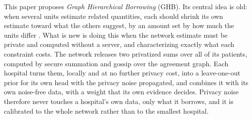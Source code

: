 \documentclass[acmsmall,screen,review]{acmart}
\theoremstyle{acmdefinition}
\begin{document}
This paper proposes \emph{Graph Hierarchical Borrowing} (GHB). Its central idea is old: when several units estimate related quantities, each should shrink its own estimate toward what the others suggest, by an amount set by how much the units differ \cite{efron1973steins,stein1956inadmissibility}. What is new is doing this when the network estimate must be private and computed without a server, and characterizing exactly what each constraint costs. The network releases two privatized sums over all of its patients, computed by secure summation and gossip over the agreement graph. Each hospital turns them, locally and at no further privacy cost, into a leave-one-out prior for its own head with the privacy noise propagated, and combines it with its own noise-free data, with a weight that its own evidence decides. Privacy noise therefore never touches a hospital's own data, only what it borrows, and it is calibrated to the whole network rather than to the smallest hospital.
\end{document}
